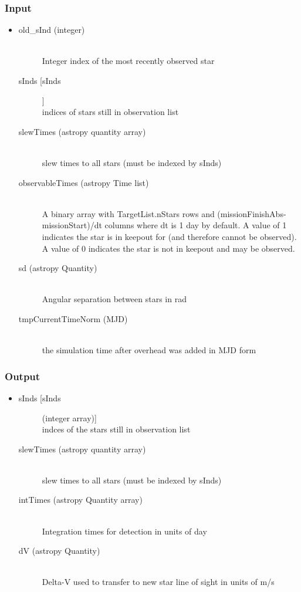\documentclass[cleanfoot]{asme2ej}
\begin{document}
\subsubsection*{Input}
\begin{itemize}
\item
\begin{description}
    \item[old\_sInd (integer)] \hfill \\ Integer index of the most recently observed star
    \item[sInds [sInds]] \hfill \\ indices of stars still in observation list
    \item[slewTimes (astropy quantity array)] \hfill \\ slew times to all stars (must be indexed by sInds)
    \item[observableTimes (astropy Time list)] \hfill \\ A binary array with TargetList.nStars rows and (missionFinishAbs-missionStart)/dt columns where dt is 1 day by default. A value of 1 indicates the star is in keepout for (and therefore cannot be observed). A value of 0 indicates the star is not in keepout and may be observed.
    \item[sd (astropy Quantity)] \hfill \\ Angular separation between stars in rad
    \item[tmpCurrentTimeNorm (MJD)] \hfill \\ the simulation time after overhead was added in MJD form
\end{description}
\end{itemize}
\subsubsection*{Output}
\begin{itemize}
\item
\begin{description}
    \item[sInds [sInds] (integer array)] \hfill \\ indces of the stars still in observation list
    \item[slewTimes (astropy quantity array)] \hfill \\ slew times to all stars (must be indexed by sInds)
    \item[intTimes (astropy Quantity array)] \hfill \\ Integration times for detection in units of day
    \item[dV (astropy Quantity)] \hfill \\ Delta-V used to transfer to new star line of sight in units of m/s
    
\end{description}
\end{itemize}
\end{document}
